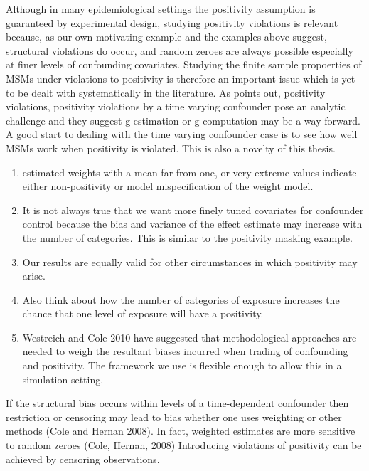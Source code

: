 \documentclass[11pt]{article}
\providecommand{\tightlist}{%
      \setlength{\itemsep}{0pt}\setlength{\parskip}{0pt}}
\begin{document}
Although in many epidemiological settings the positivity assumption is
guaranteed by experimental design, studying positivity violations is
relevant because, as our own motivating example and the examples above
suggest, structural violations do occur, and random zeroes are always
possible especially at finer levels of confounding covariates. Studying
the finite sample propoerties of MSMs under violations to positivity is
therefore an important issue which is yet to be dealt with
systematically in the literature. As \citet{Westreich2010} points out,
positivity violations, positivity violations by a time varying
confounder pose an analytic challenge and they suggest g-estimation or
g-computation may be a way forward. A good start to dealing with the
time varying confounder case is to see how well MSMs work when
positivity is violated. This is also a novelty of this thesis.

\begin{enumerate}
\def\labelenumi{\arabic{enumi}.}
\setcounter{enumi}{5}
\tightlist
\item
  estimated weights with a mean far from one, or very extreme values
  indicate either non-positivity or model mispecification of the weight
  model.
\item
  It is not always true that we want more finely tuned covariates for
  confounder control because the bias and variance of the effect
  estimate may increase with the number of categories. This is similar
  to the positivity masking example.
\item
  Our results are equally valid for other circumstances in which
  positivity may arise.
\item
  Also think about how the number of categories of exposure increases
  the chance that one level of exposure will have a positivity.
\item
  Westreich and Cole 2010 have suggested that methodological approaches
  are needed to weigh the resultant biases incurred when trading of
  confounding and positivity. The framework we use is flexible enough to
  allow this in a simulation setting.
\end{enumerate}

If the structural bias occurs within levels of a time-dependent
confounder then restriction or censoring may lead to bias whether one
uses weighting or other methods (Cole and Hernan 2008). In fact,
weighted estimates are more sensitive to random zeroes (Cole, Hernan,
2008) Introducing violations of positivity can be achieved by censoring
observations.
\end{document}
